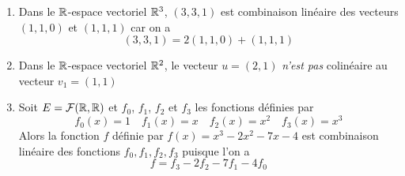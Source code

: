 \begin{frame}
\begin{exemple}
\begin{enumerate}
  \item Dans le $\mathbb{R}$-espace vectoriel $\mathbb{R}^3$, $(3,3,1)$ est combinaison linéaire des vecteurs 
 $(1,1,0)$ et $(1,1,1)$ car on a 
 $$(3,3,1)=2(1,1,0)+(1,1,1)$$
 \vspace*{-2ex}
 \pause   
  \item Dans le $\mathbb{R}$-espace vectoriel $\mathbb{R}^2$, le vecteur
$u=(2,1)$ \emph{n'est pas} colinéaire au vecteur $v_1=(1,1)$
 \pause  
 
 \medskip 
  \item Soit $E=\mathcal{F}(\mathbb{R}, \mathbb{R})$ et $f_0$, $f_1$, $f_2$ et $f_3$ les fonctions définies par 
 $$f_0(x)=1 \quad f_1(x)=x \quad f_2(x)=x^2 \quad f_3(x)=x^3$$
 \pause
 Alors la fonction $f$ définie par $f(x)=x^3-2x ^2-7x-4$
 est combinaison linéaire des fonctions $f_0, f_1, f_2, f_3$ puisque l'on a 
 $$f=f_{3}-2f_2-7f_1-4f_0$$ 
  
 
\end{enumerate}
\end{exemple}
\end{frame}



